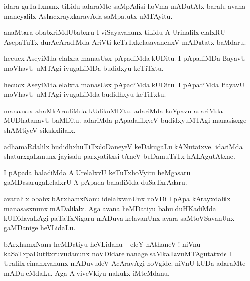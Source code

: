 \documentclass{article}
\begin{document}
\begin{mng}%
idara guTaTxnunx tiLidu adaraMte saMpAdisi hoVma mADutAtx baralu avana maneyalilx 
AshacxrayxkaravAda saMpatutx uMTAyitu. 
\end{mng}

\begin{mng}%
anaMtara obabxriMdUbabxru I viSayavanunx tiLidu A Urinalilx elalxRU AsepaTuTx durAcAradiMda AriVti 
keTaTxkelasavanenxV mADutatx baMdaru.
\end{mng}

\begin{mng}%
hecucx AseyiMda elalxra manasUsx pApadiMda kUDitu. I pApadiMDa BayavU moVhavU uMTAgi ivugaLiMDa 
budidxyu keTiTxtu.
\end{mng}

\begin{mng}%
hecucx AseyiMda elalxra manasUsx pApadiMda kUDitu. I pApadiMda BayavU moVhavU uMTAgi ivugaLiMda 
budidhxyu keTiTxtu.
\end{mng}

\begin{mng}%
manasusx ahaMkAradiMda kUdikoMDitu. adariMda koVpavu adariMda MUDhatanavU baMDitu. adariMda 
pApadalilxyeV budidxyuMTAgi manasisxge shAMtiyeV sikakxlilalx.
\end{mng}

\begin{mng}%
adhamaRdalilx budidhxhuTiTxdoDaneyeV keDakugaLu kANutatxve. idariMda shaturxgaLanunx jayisalu 
parxyatitxsi tAneV buDamuTaTx hALAgutAtxne.
\end{mng}

\begin{mng}%
I pApada baladiMda A UrelalxvU keTuTxhoVyitu heMgasaru gaMDasarugaLelalxrU A pApada baladiMda 
duSaTxrAdaru.
\end{mng}

\begin{mng}%
avaralilx obabx bArxhamxNanu idelalxvanUnx noVDi I pApa kArayxdalilx manasasxnunx mADalilalx. Aga 
avana heMDatiyu bahu duHKadiMda kUDidavaLAgi paTaTxNigaru mADuva kelavanUnx avara saMtoVSavanUnx 
gaMDanige heVLidaLu.
\end{mng}

\begin{mng}%
bArxhamxNana heMDatiyu heVLidanu -- eleY nAthaneV ! niVnu kaSaTxpaDutitxruvudanunx noVDidare 
nanage saMkaTavuMTAgutatxde I Uralilx cinanxvanunx mADuvudeV AcAravAgi hoVgide. niVnU kUDa 
adaraMte mADu eMdaLu. Aga A viveVkiyu nakukx iMteMdanu.
\end{mng}
\end{document}
